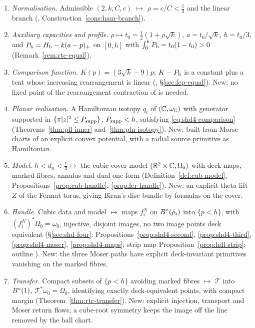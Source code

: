 \begin{enumerate}[label=\textbf{F\arabic*},leftmargin=*,itemsep=3pt]
\item \emph{Normalisation.} Admissible $(2,k,C,c)$ $\mapsto$ $\rho=c/C<\frac13$ and the linear branch
 (, Construction~\ref{cons:ham-branch}).
\item \emph{Auxiliary capacities and profile.} $\rho\mapsto t_0=\frac12(1+\rho\sqrt k)$, $a=t_0/\sqrt k$, $h=t_0/3$, and
 $P_{\mathrm b}=H_{\mathrm b}-k(a-p)_+$ on $[0,h]$ with $\int_0^hP_{\mathrm b}=t_0(1-t_0)>0$ (Remark~\ref{rem:rtc-equal}).
\item \emph{Comparison function.} $K(p)=(3\sqrt k-9)p$; $K-P_{\mathrm b}$ is a constant plus a tent whose increasing rearrangement
 is linear (, \S\ref{sec:fcp-equal}). New: no fixed point of the rearrangement
 contraction of \cite{OpenAI2026} is needed.
\item \emph{Planar realisation.} A Hamiltonian isotopy $q_t$ of $(\mathbb{C},\omega_{\mathbb{C}})$ with generator supported in
 $\{\pi|z|^2\le P_{\rm supp}\}$, $P_{\rm supp}<h$, satisfying \eqref{eq:shd4-comparison} (Theorems~\ref{thm:pll-inner}
 and~\ref{thm:pln-isotopy}). New: built from Morse charts of an explicit convex potential, with a radial source
 primitive as Hamiltonian.
\item \emph{Model.} $h<d_n<\frac13\mapsto$ the cubic cover model $(\mathbb{R}^2\times\mathbb{C},\Omega_0)$ with deck maps, marked fibres, annulus and dual one-form (Definition~\ref{def:cub-model}, Propositions~\ref{prop:cub-handle}, \ref{prop:fer-handle}). New: an explicit theta lift $Z$ of the Fermat torus, giving Biran's disc bundle \cite{Biran2001} by formulas on the cover.
\item \emph{Handle.} Cubic data and model $\mapsto$ maps $f^N_i$ on $B^{\circ}(\hat\rho_i)$ into $\{p<h\}$, with $(f^N_i)^*\Omega_0=\omega_0$, injective, disjoint images, no two image points deck equivalent (\S\ref{sec:shd-four}: Propositions~\ref{prop:shd4-second}, \ref{prop:shd4-third}, \ref{prop:shd4-moser}, \ref{prop:shd4-maps}; strip map Proposition~\ref{prop:hdl-strip}; outline ). New: the three Moser paths have explicit deck-invariant primitives vanishing on the marked fibres.
\item \emph{Transfer.} Compact subsets of $\{p<h\}$ avoiding marked fibres $\mapsto$ $\mathcal T$ into $B^{\circ}(1)$, $\mathcal T^*\omega_0=\Omega_0$, identifying exactly deck-equivalent points, with compact margin (Theorem~\ref{thm:rtc-transfer}). New: explicit injection, transport and Moser return flows; a cube-root symmetry keeps the image off the line removed by the ball chart.

\end{enumerate}
